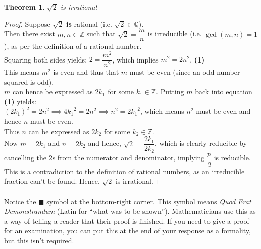 \documentclass[12pt, a4paper, titlepage, twoside]{article}
\newcommand*{\Z}{\mathbb{Z}}
\newcommand*{\Q}{\mathbb{Q}}
\newtheorem*{theorem*}{Theorem}
\begin{document}
	\begin{pf}
		\label{pf:root2}
		\begin{theorem*}
			$\sqrt{2}$ is irrational
		\end{theorem*}

		\tcbline		
		
		\begin{proof}
			Suppose $\sqrt{2}$ \textbf{is} rational (i.e. $\sqrt{2} \in \Q$).\\
			
			Then there exist $m, n \in \Z$ such that $\sqrt{2} =  \dfrac{m}{n}$ is irreducible (i.e. $\gcd(m,n) = 1$), 
			as per the definition of a rational number. \\
			
			Squaring both sides yields: $2 = \dfrac{m^2}{n^2}$, which implies $m^2 = 2n^2$. \hfill \textbf{(1)} \\
			
			This means $m^2$ is even and thus that $m$ must be even (since an odd number squared is odd).\\
			
			$m$ can hence be expressed as $2k_1$ for some $k_1 \in \Z$. Putting $m$ back into equation \textbf{(1)} yields:\\
			
			$(2k_1)^2 = 2n^2 \implies 4{k_1}^2 = 2n^2 \implies n^2 = 2{k_1}^2$, which means $n^2$ must be even and hence $n$
			must be even.\\
			
			Thus $n$ can be expressed as $2k_2$ for some $k_2 \in \Z$.\\
			
			Now $m = 2k_1$ and $n = 2k_2$ and hence, $\sqrt{2} = \dfrac{2k_1}{2k_2}$, which is clearly reducible by cancelling
			the $2$s from the numerator and denominator, implying $\dfrac{p}{q}$ is reducible.\\
			
			This is a contradiction to the definition of rational numbers, as an irreducible fraction can't be found. Hence,
			$\sqrt{2}$ is irrational.
		\end{proof}
		
	\end{pf}
	
	\paragraph{}
	Notice the $\blacksquare$ symbol at the bottom-right corner. This symbol means \textit{Quod Erat Demonstrandum} 
	(Latin for ``what was to be shown''). Mathematicians use this as a way of telling a reader that their proof is finished.
	If you need to give a proof for an examination, you can put this at the end of your response as a formality, but this isn't
	required.
	
\end{document}

